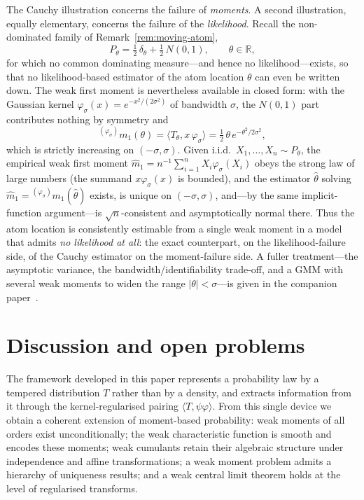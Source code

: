 \documentclass[12pt]{article}
\theoremstyle{definition}
\newcommand{\R}{\mathbb{R}}
\begin{document}
The Cauchy illustration concerns the failure of \emph{moments}.  A second
illustration, equally elementary, concerns the failure of the
\emph{likelihood}.  Recall the non-dominated family of
Remark~\ref{rem:moving-atom},
\[
   P_\theta=\tfrac12\,\delta_\theta+\tfrac12\,N(0,1),\qquad\theta\in\R,
\]
for which no common dominating measure---and hence no likelihood---exists, so
that no likelihood-based estimator of the atom location $\theta$ can even be
written down.  The weak first moment is nevertheless available in closed form:
with the Gaussian kernel $\varphi_\sigma(x)=e^{-x^2/(2\sigma^2)}$ of bandwidth $\sigma$, the $N(0,1)$ part contributes nothing
by symmetry and
\[
   {}^{(\varphi_\sigma)}m_1(\theta)
   =\langle T_\theta,x\,\varphi_\sigma\rangle
   =\tfrac12\,\theta\,e^{-\theta^2/2\sigma^2},
\]
which is strictly increasing on $(-\sigma,\sigma)$.  Given i.i.d.\
$X_1,\dots,X_n\sim P_\theta$, the empirical weak first moment
$\widehat m_1=n^{-1}\sum_{i=1}^n X_i\varphi_\sigma(X_i)$ obeys the strong law
of large numbers (the summand $x\varphi_\sigma(x)$ is bounded), and the
estimator $\widehat\theta$ solving
$\widehat m_1={}^{(\varphi_\sigma)}m_1(\widehat\theta)$ exists, is unique on
$(-\sigma,\sigma)$, and---by the same implicit-function argument---is
$\sqrt n$-consistent and asymptotically normal there.  Thus the atom location
is consistently estimable from a single weak moment in a model that admits
\emph{no likelihood at all}: the exact counterpart, on the
likelihood-failure side, of the Cauchy estimator on the moment-failure side.
A fuller treatment---the asymptotic variance, the bandwidth/identifiability
trade-off, and a GMM with several weak moments to widen the range
$|\theta|<\sigma$---is given in the companion paper~\cite{LabouriauA2}.


\section{Discussion and open problems}
\label{sec:discussion}

The framework developed in this paper represents a probability law by a
tempered distribution $T$ rather than by a density, and extracts information
from it through the kernel-regularised pairing $\langle T,\psi\varphi\rangle$. From this single
device we obtain a coherent extension of moment-based probability:
weak moments of all orders exist unconditionally; the weak characteristic
function is smooth and encodes these moments; weak cumulants retain their
algebraic structure under independence and affine transformations; a weak
moment problem admits a hierarchy of uniqueness results; and a weak central
limit theorem holds at the level of regularised transforms.
\end{document}

